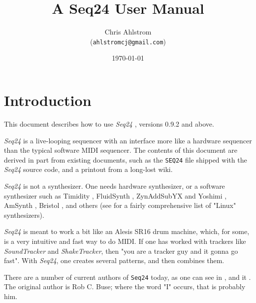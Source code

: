 \documentclass[
 11pt,
 twoside,
 a4paper,
 headinclude,
 footinclude,
 final                                 %
]{article}
\begin{document}
\title{A Seq24 User Manual}
\author{Chris Ahlstrom\\
   (\texttt{ahlstromcj@gmail.com})}
\date{\today}
\maketitle
\tableofcontents
\listoffigures                         %


\setlength{\parindent}{0pt}
\setlength{\parskip}{1ex plus 0.5ex minus 0.2ex}

\section{Introduction}
\label{sec:introduction}

   This document describes how to use \textsl{Seq24} \cite{seq24},
   versions 0.9.2 and above.

   \textsl{Seq24} is
   a live-looping sequencer with an interface more like a hardware sequencer
   than the typical software MIDI sequencer.  The contents of this document
   are derived in part from existing documents, such as the \texttt{SEQ24}
   file shipped with the \textsl{Seq24} source code, and a printout from a
   long-lost wiki.

   \textsl{Seq24} is not a synthesizer.  One needs hardware synthesizer, or
   a software synthesizer such as
   Timidity \cite{timidity},
   FluidSynth \cite{fluidsynth},
   ZynAddSubYX \cite{zynaddsubfx} and Yoshimi \cite{yoshimi} \cite{yoshimi2},
   AmSynth \cite{amsynth},
   Bristol \cite{bristol},
   and others (see \cite{linuxsynths} for a fairly comprehensive list of
   "Linux" synthesizers).

   \textsl{Seq24} is meant to work a bit like an Alesis SR16 drum machine,
   which, for some, is a very intuitive and fast way to do MIDI.
   If one has worked with trackers like \textsl{SoundTracker} and
   \textsl{ShakeTracker}, then "you are a tracker guy and it gonna go fast".
   With \textsl{Seq24}, one creates several patterns, and then combines them.

   There are a number of current authors of \texttt{Seq24} today,
   as one can see in
   ,
   and it
   .
   The original author is Rob C. Buse; where the word "I" occurs, that is
   probably him.
\end{document}
